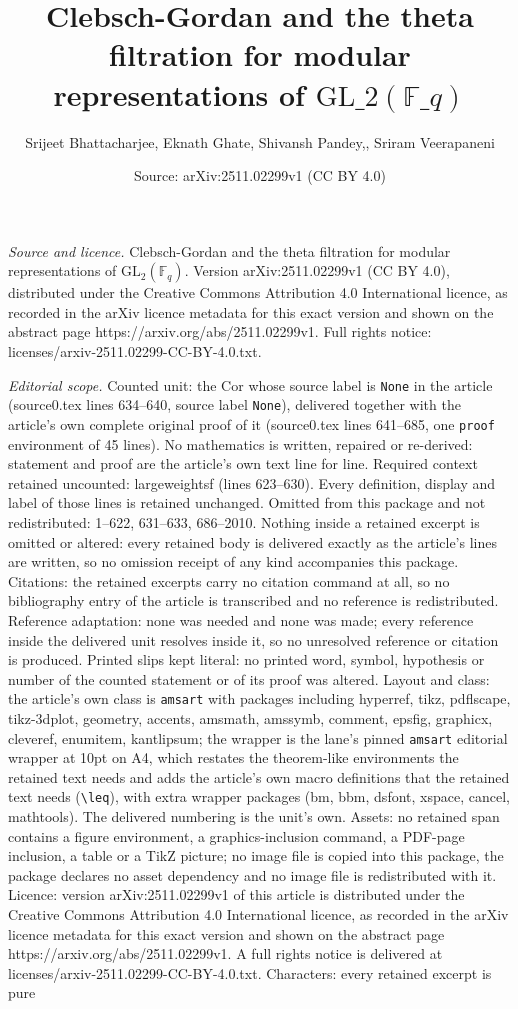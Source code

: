 \documentclass[10pt,a4paper]{amsart}
\title[Clebsch-Gordan and the theta filtration for modular represen]{Clebsch-Gordan and the theta filtration for modular representations of $\mathrm{GL}\_2({\mathbb F}\_q)$}
\author{Srijeet Bhattacharjee, Eknath Ghate, Shivansh Pandey,, Sriram Veerapaneni}
\date{Source: arXiv:2511.02299v1 (CC BY 4.0)}
\begin{document}
\maketitle

\noindent\emph{Source and licence.} Clebsch-Gordan and the theta filtration for modular representations of $\mathrm{GL}_2({\mathbb F}_q)$. Version arXiv:2511.02299v1 (CC BY 4.0), distributed under the Creative Commons Attribution 4.0 International licence, as recorded in the arXiv licence metadata for this exact version and shown on the abstract page https://arxiv.org/abs/2511.02299v1. Full rights notice: licenses/arxiv-2511.02299-CC-BY-4.0.txt.\par\smallskip

\noindent\textit{Editorial scope.} Counted unit: the Cor whose source label is \texttt{None} in the article (source0.tex lines 634--640, source label \texttt{None}), delivered together with the article's own complete original proof of it (source0.tex lines 641--685, one \texttt{proof} environment of 45 lines). No mathematics is written, repaired or re-derived: statement and proof are the article's own text line for line. Required context retained uncounted: largeweightsf (lines 623--630). Every definition, display and label of those lines is retained unchanged. Omitted from this package and not redistributed: 1--622, 631--633, 686--2010. Nothing inside a retained excerpt is omitted or altered: every retained body is delivered exactly as the article's lines are written, so no omission receipt of any kind accompanies this package. Citations: the retained excerpts carry no citation command at all, so no bibliography entry of the article is transcribed and no reference is redistributed. Reference adaptation: none was needed and none was made; every reference inside the delivered unit resolves inside it, so no unresolved reference or citation is produced. Printed slips kept literal: no printed word, symbol, hypothesis or number of the counted statement or of its proof was altered. Layout and class: the article's own class is \texttt{amsart} with packages including hyperref, tikz, pdflscape, tikz-3dplot, geometry, accents, amsmath, amssymb, comment, epsfig, graphicx, cleveref, enumitem, kantlipsum; the wrapper is the lane's pinned \texttt{amsart} editorial wrapper at 10pt on A4, which restates the theorem-like environments the retained text needs and adds the article's own macro definitions that the retained text needs (\texttt{\textbackslash leq}), with extra wrapper packages (bm, bbm, dsfont, xspace, cancel, mathtools). The delivered numbering is the unit's own. Assets: no retained span contains a figure environment, a graphics-inclusion command, a PDF-page inclusion, a table or a TikZ picture; no image file is copied into this package, the package declares no asset dependency and no image file is redistributed with it. Licence: version arXiv:2511.02299v1 of this article is distributed under the Creative Commons Attribution 4.0 International licence, as recorded in the arXiv licence metadata for this exact version and shown on the abstract page https://arxiv.org/abs/2511.02299v1. A full rights notice is delivered at licenses/arxiv-2511.02299-CC-BY-4.0.txt. Characters: every retained excerpt is pure 
\end{document}
